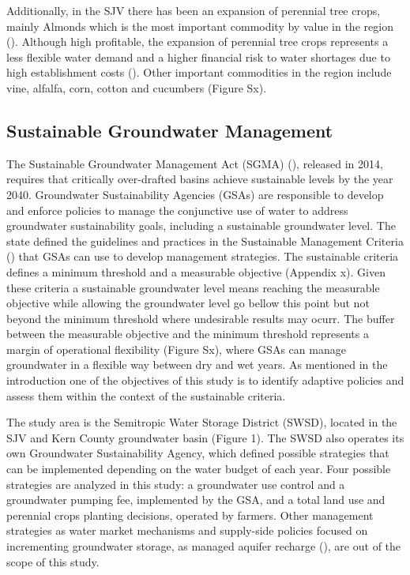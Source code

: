 \documentclass[11pt,a4paper]{article}
\begin{document}
 Additionally, in the SJV there has been an expansion of perennial tree crops, mainly Almonds which is the most important commodity by value  in the region (\cite{usda_national_2020}). Although high profitable, the expansion of perennial tree crops represents a less flexible water demand and a higher financial risk to water shortages due to high establishment costs (\cite{qin_flexibility_2019,mall_water_2019}). Other important commodities in the region include vine, alfalfa, corn, cotton and cucumbers (Figure Sx). 

\subsection{Sustainable Groundwater Management}

 The Sustainable Groundwater Management Act (SGMA) (\cite{dwr_sustainable_2021}), released in 2014, requires that critically over-drafted basins achieve sustainable levels by the year 2040. Groundwater Sustainability Agencies (GSAs) are responsible to develop and enforce policies to manage the conjunctive use of water to address groundwater sustainability goals, including a sustainable groundwater level. The state defined the guidelines and practices in the Sustainable Management Criteria (\cite{dwr_sustainable_2017}) that GSAs can use to develop management strategies. The sustainable criteria defines a minimum threshold and a measurable objective (Appendix x). Given these criteria a sustainable groundwater level means reaching the measurable objective while allowing the groundwater level go bellow this point but not beyond the minimum threshold where undesirable results may ocurr. The buffer between the measurable objective and the minimum threshold represents a margin of operational flexibility (Figure Sx), where GSAs can manage groundwater in a flexible way between dry and wet years. As mentioned in the introduction one of the objectives of this study is to identify adaptive policies and assess them within the context of the sustainable criteria. 
  
The study area is the Semitropic Water Storage District (SWSD), located in the SJV and Kern County groundwater basin (Figure 1). The SWSD also operates its own Groundwater Sustainability Agency, which defined possible strategies that can be implemented depending on the water budget of each year. Four possible strategies are analyzed in this study: a groundwater use control and a groundwater pumping fee, implemented by the GSA, and a total land use and perennial crops planting decisions, operated by farmers. Other management strategies as water market mechanisms and supply-side policies focused on incrementing groundwater storage, as managed aquifer recharge (\cite{ulibarri_assessing_2021}), are out of the scope of this study. 
\end{document}
